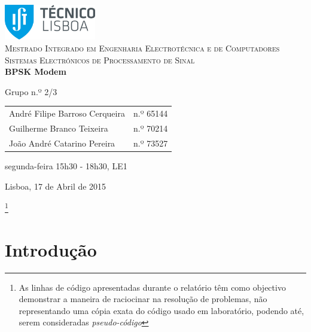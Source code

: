 \documentclass[11pt]{article}
\begin{document}
	
\begin{titlepage}
	\begin{center}
		
		\hfill \break
		\hfill \break
		
		\includegraphics[width=0.3\textwidth]{./logo}~\\[1cm]
		
		\textsc{\Large Mestrado Integrado em Engenharia Electrotécnica e de Computadores}\\[1.5cm]
		\textsc{\huge Sistemas Electrónicos de Processamento de Sinal}\\[0.25cm]
		
		{\huge \bfseries BPSK Modem \\[1.2cm]}
		
		Grupo n.º 2/3 \vspace{0.3cm}
		
		\begin{tabular}{l r}
			André Filipe Barroso Cerqueira \hspace{1mm} & n.º 65144 \\
			Guilherme Branco Teixeira \hspace{1mm} & n.º 70214  \\
			João André Catarino Pereira & n.º 73527
		\end{tabular}
		
		\hfill
		\hfill
		
		segunda-feira 15h30 - 18h30, LE1
		
	
		\vfill
		
		{\large Lisboa, 17 de Abril de 2015} 
		
	\end{center}
\end{titlepage}
\clearpage

	\footnote{As linhas de código apresentadas durante o relatório têm como objectivo demonstrar a maneira de raciocinar na resolução de problemas, não representando uma cópia exata do código usado em laboratório, podendo até, serem consideradas \textit{pseudo-código}}
	
\tableofcontents
\pagebreak

\clearpage
{}

\section{Introdução}
\end{document}
